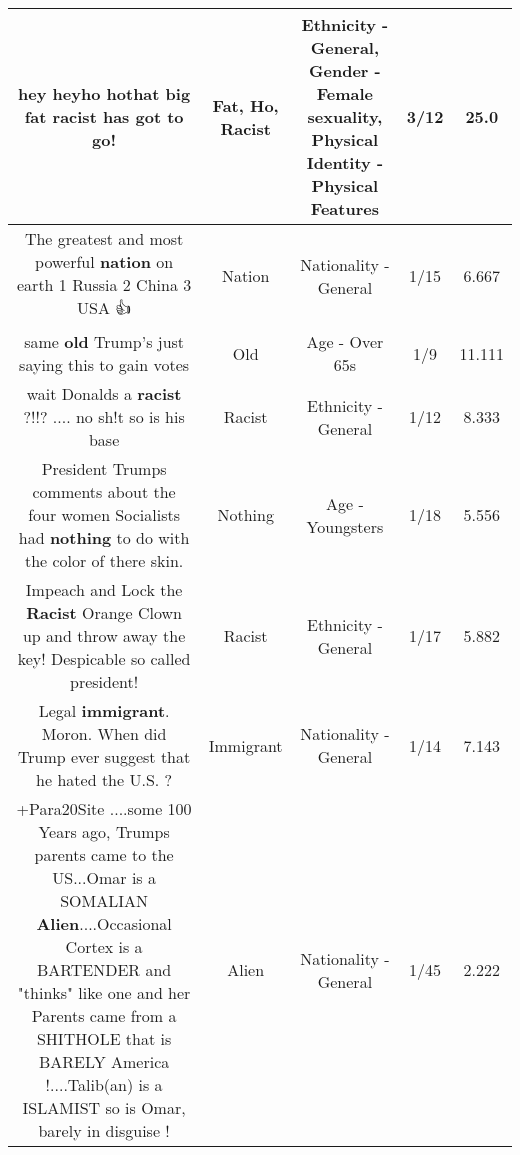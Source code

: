 \documentclass[11pt]{article}
\newlength\mylength
\begin{document}
\begin{center}
\begin{longtable}{|C{.65\mylength}|C{.30\mylength}|C{.12\mylength}|C{.12\mylength}|C{.12\mylength}|}
  \small hey hey\textbf{ho} \textbf{ho}that big \textbf{fat} \textbf{racist} has got to go!\normalsize   & Fat, Ho, Racist & Ethnicity - General, Gender - Female sexuality, Physical Identity - Physical Features & 3/12 & 25.0 \\  \hline
  \small The greatest and most powerful \textbf{nation} on earth 1 Russia 2 China 3 USA 👍\normalsize   & Nation & Nationality - General & 1/15 & 6.667 \\  \hline
  \small same \textbf{old} Trump's just saying this to gain votes\normalsize   & Old & Age - Over 65s & 1/9 & 11.111 \\  \hline
  \small wait Donalds a \textbf{racist} ?!!? .... no sh!t so is his base\normalsize   & Racist & Ethnicity - General & 1/12 & 8.333 \\  \hline
  \small President Trumps comments about the four women Socialists had \textbf{nothing} to do with the color of there skin.\normalsize   & Nothing & Age - Youngsters & 1/18 & 5.556 \\  \hline
  \small Impeach and Lock the \textbf{Racist} Orange Clown up and throw away the key! Despicable so called president!\normalsize   & Racist & Ethnicity - General & 1/17 & 5.882 \\  \hline
  \small Legal \textbf{immigrant}.  Moron.  When did Trump ever  suggest that he hated the U.S. ?\normalsize   & Immigrant & Nationality - General & 1/14 & 7.143 \\  \hline
  \small +Para20Site  ....some 100 Years ago, Trumps parents came to the US...Omar is a SOMALIAN \textbf{Alien}....Occasional Cortex is a BARTENDER and "thinks" like one and her Parents came from a SHITHOLE that is BARELY America !....Talib(an) is a ISLAMIST so is Omar, barely in disguise !\normalsize   & Alien & Nationality - General & 1/45 & 2.222 \\  \hline

\end{longtable}
\end{center}
\end{document}
